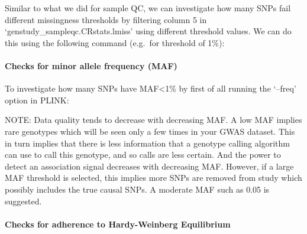 \documentclass[]{book}
\newenvironment{Shaded}{\begin{snugshade}}{\end{snugshade}}
\newcommand{\KeywordTok}[1]{\textcolor[rgb]{0.13,0.29,0.53}{\textbf{#1}}}
\newcommand{\StringTok}[1]{\textcolor[rgb]{0.31,0.60,0.02}{#1}}
\newcommand{\FunctionTok}[1]{\textcolor[rgb]{0.00,0.00,0.00}{#1}}
\newcommand{\ExtensionTok}[1]{#1}
\newcommand{\NormalTok}[1]{#1}
\let\oldparagraph\paragraph
\renewcommand{\paragraph}[1]{\oldparagraph{#1}\mbox{}}
\begin{document}
Similar to what we did for sample QC, we can investigate how many SNPs
fail different missingness thresholds by filtering column 5 in
`genstudy\_sampleqc.CRstats.lmiss' using different threshold values. We
can do this using the following command (e.g.~for threshold of 1\%):

\begin{Shaded}
\end{Shaded}

\paragraph{Checks for minor allele frequency
(MAF)}\label{checks-for-minor-allele-frequency-maf}

To investigate how many SNPs have MAF\textless{}1\% by first of all
running the `--freq' option in PLINK:

\begin{Shaded}
\end{Shaded}

NOTE: Data quality tends to decrease with decreasing MAF. A low MAF
implies rare genotypes which will be seen only a few times in your GWAS
dataset. This in turn implies that there is less information that a
genotype calling algorithm can use to call this genotype, and so calls
are less certain. And the power to detect an association signal
decreases with decreasing MAF. However, if a large MAF threshold is
selected, this implies more SNPs are removed from study which possibly
includes the true causal SNPs. A moderate MAF such as 0.05 is suggested.

\paragraph{Checks for adherence to Hardy-Weinberg
Equilibrium}\label{checks-for-adherence-to-hardy-weinberg-equilibrium}
\end{document}
